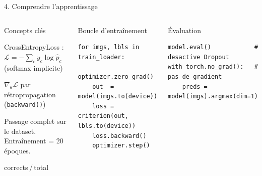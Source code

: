 \documentclass[aspectratio=169]{beamer}
\begin{document}
\begin{frame}[fragile]{4. Comprendre l'apprentissage}
  \begin{columns}[T,onlytextwidth]
      \begin{block}{Concepts clés}
        \small
        \begin{description}\setlength\itemsep{5pt}
          \item[\textbf{Loss}] CrossEntropyLoss :
                $\mathcal{L} = -\sum_c y_c \log \hat{p}_c$
                (softmax implicite)
          \item[\textbf{Gradient}] $\nabla_\theta \mathcal{L}$
                par rétropropagation (\texttt{backward()})
          \item[\textbf{Époque}] Passage complet sur le dataset.
                Entraînement = 20 époques.
          \item[\textbf{Accuracy}] corrects\,/\,total
        \end{description}
      \end{block}
      \begin{block}{Boucle d'entraînement}
\begin{lstlisting}
for imgs, lbls in train_loader:
    optimizer.zero_grad()
    out  = model(imgs.to(device))
    loss = criterion(out, lbls.to(device))
    loss.backward()
    optimizer.step()
\end{lstlisting}
      \end{block}
      \vspace{3pt}
      \begin{block}{Évaluation}
\begin{lstlisting}
model.eval()            # desactive Dropout
with torch.no_grad():   # pas de gradient
    preds = model(imgs).argmax(dim=1)
\end{lstlisting}
      \end{block}
  \end{columns}
\end{frame}
\end{document}

